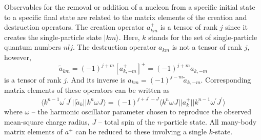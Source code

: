 \documentclass[
12pt, %
oneside, %
english, %
doublespacing, %
doublespacing, %
toctotoc, %
parskip, %
headsepline, %
]{MastersDoctoralThesis} %
\begin{document}
Observables for the removal or addition of a nucleon from a specific initial state to a
specific final state are related to the matrix elements of the creation and destruction
operators.
The creation operator $a^+_{km}$ is a tensor of rank $j$ since it creates the single-particle state $\vert km \rangle$. Here, $k$ stands for the set of single-particle quantum numbers $nlj$.
 The destruction operator $a_{km}$ is not a tensor of rank $j$, however,
 \begin{equation}
 \tilde{a}_{km}=(-1)^{j+m} \left[ a^+_{k,-m} \right]^+ =
 (-1)^{j+m} a_{k,-m}
 \end{equation}
is a tensor of rank $j$. And its inverse is $ a_{km}=(-1)^{j-m}\tilde{a}_{k,-m}$. 
Corresponding matrix elements of these operators can be written as
\begin{equation}
\langle
 k^{n-1} \omega^{\prime} J^{\prime}
\vert \vert
\tilde{a}_k
 \vert \vert
 k^{n} \omega^{} J^{}
  \rangle 
  = 
  (-1)^{j+J^{\prime}-J}
  \langle
  k^{n} \omega^{} J^{}
\vert \vert
{a}^{+}_k
 \vert \vert
 k^{n-1} \omega^{\prime} J^{\prime}
  \rangle 
  \label{matrix_elements_of_sa}
\end{equation}
where $\omega$ -- the harmonic oscillator parameter chosen to reproduce the observed mean-square charge radius, $J$ -- total spin of the $n$-particle state.
All many-body matrix elements of $a^+$ can be reduced to these involving a single
$k$-state.
\end{document}
